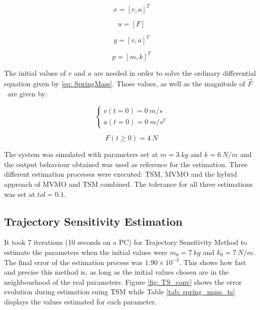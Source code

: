 \begin{equation}
	x = [v, a]^{T}
	\label{eq: spring_mass_x}
\end{equation}

\begin{equation}
	u = [F]
	\label{eq: spring_mass_u}
\end{equation}

\begin{equation}
	y = [v, a]^{T}
	\label{eq: spring_mass_y}
\end{equation}

\begin{equation}
	p = [m, k]^{T}
	\label{eq: spring_mass_p}
\end{equation}

The initial values of $v$ and $a$ are needed in order to solve the ordinary differential equation given by \eqref{eq: SpringMass}. Those values, as well as the magnitude of $\vec{F}$\ are given by:

\begin{equation}
	\begin{cases}
		v(t=0) = 0\ m/s\\
		a(t=0) = 0\ m/s^{2}
	\end{cases}
\end{equation}

\begin{equation}
	F(t\geq 0) = 4\ N
\end{equation}

The system was simulated with parameters set at $m = 3\ kg$ and $k = 6\ N/m$ and the output behaviour obtained was used as reference for the estimation. Three different estimation processes were executed: TSM, MVMO and the hybrid approach of MVMO and TSM combined. The tolerance for all three estimations was set at $tol = 0.1$.

\subsection{Trajectory Sensitivity Estimation}

It took 7 iterations (10 seconds on a PC) for Trajectory Sensitivity Method to estimate the parameters when the initial values were $m_{0} = 7\ kg$ and $k_{0} = 7\ N/m$. The final error of the estimation process was $1.90\times 10^{-3}$. This shows how fast and precise this method is, as long as the initial values chosen are in the neighbourhood of the real parameters. Figure \ref{fig: TS_conv} shows the error evolution during estimation suing TSM while Table \ref{tab: spring_mass_ts} displays the values estimated for each parameter.

